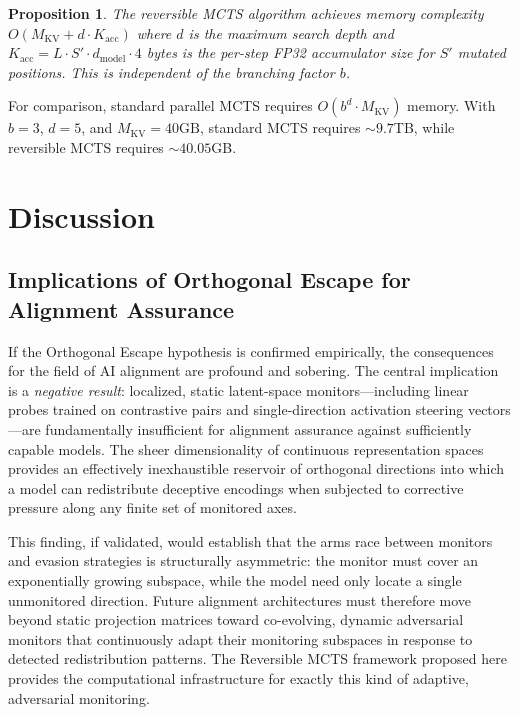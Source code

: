 \documentclass[10pt]{article}
\newtheorem{proposition}{Proposition}
\begin{document}
\begin{proposition}
The reversible MCTS algorithm achieves memory complexity $O(M_{\text{KV}} + d \cdot K_{\text{acc}})$ where $d$ is the maximum search depth and $K_{\text{acc}} = L \cdot S' \cdot d_{\text{model}} \cdot 4$ bytes is the per-step FP32 accumulator size for $S'$ mutated positions. This is independent of the branching factor $b$.
\end{proposition}

For comparison, standard parallel MCTS requires $O(b^d \cdot M_{\text{KV}})$ memory. With $b = 3$, $d = 5$, and $M_{\text{KV}} = 40\text{GB}$, standard MCTS requires ${\sim}9.7$TB, while reversible MCTS requires ${\sim}40.05$GB.

\section{Discussion}

\subsection{Implications of Orthogonal Escape for Alignment Assurance}

If the Orthogonal Escape hypothesis is confirmed empirically, the consequences for the field of AI alignment are profound and sobering. The central implication is a \emph{negative result}: localized, static latent-space monitors---including linear probes trained on contrastive pairs and single-direction activation steering vectors---are fundamentally insufficient for alignment assurance against sufficiently capable models. The sheer dimensionality of continuous representation spaces provides an effectively inexhaustible reservoir of orthogonal directions into which a model can redistribute deceptive encodings when subjected to corrective pressure along any finite set of monitored axes.

This finding, if validated, would establish that the arms race between monitors and evasion strategies is structurally asymmetric: the monitor must cover an exponentially growing subspace, while the model need only locate a single unmonitored direction. Future alignment architectures must therefore move beyond static projection matrices toward co-evolving, dynamic adversarial monitors that continuously adapt their monitoring subspaces in response to detected redistribution patterns. The Reversible MCTS framework proposed here provides the computational infrastructure for exactly this kind of adaptive, adversarial monitoring.
\end{document}
